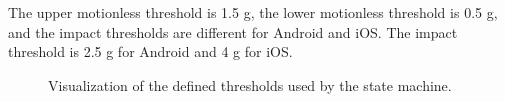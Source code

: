 \documentclass[12pt, a4paper, onecolumn]{article}
\begin{document}
	The upper motionless threshold is 1.5 g, the lower motionless threshold is 0.5 g, and the impact thresholds are different for Android and iOS. The impact threshold is 2.5 g for Android and 4 g for iOS.
	
	\begin{figure}[H]
		\centering
		\caption{Visualization of the defined thresholds used by the state machine.}%
		\label{fig:thresholds}%
	\end{figure}
	
\end{document}
